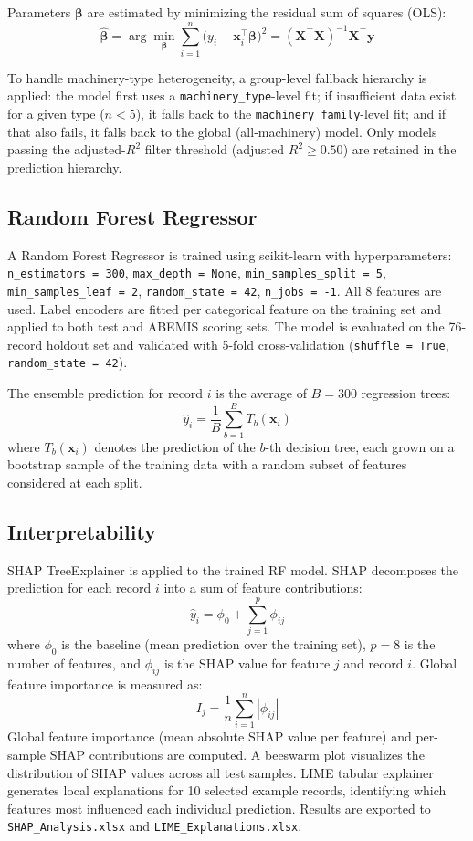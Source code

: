 \documentclass[conference]{IEEEtran}
\begin{document}
Parameters $\boldsymbol{\beta}$ are estimated by minimizing the residual sum of squares (OLS):
\[
\hat{\boldsymbol{\beta}} = \arg\min_{\boldsymbol{\beta}} \sum_{i=1}^{n}\bigl(y_i - \mathbf{x}_i^{\top}\boldsymbol{\beta}\bigr)^2 = (\mathbf{X}^{\top}\mathbf{X})^{-1}\mathbf{X}^{\top}\mathbf{y}
\]

To handle machinery-type heterogeneity, a group-level fallback hierarchy is applied: the model first uses a \texttt{machinery\_type}-level fit; if insufficient data exist for a given type ($n < 5$), it falls back to the \texttt{machinery\_family}-level fit; and if that also fails, it falls back to the global (all-machinery) model. Only models passing the adjusted-$R^2$ filter threshold (adjusted $R^2 \geq 0.50$) are retained in the prediction hierarchy.

\subsection{Random Forest Regressor}

A Random Forest Regressor is trained using scikit-learn with hyperparameters: \texttt{n\_estimators\,=\,300}, \texttt{max\_depth\,=\,None}, \texttt{min\_samples\_split\,=\,5}, \texttt{min\_samples\_leaf\,=\,2}, \texttt{random\_state\,=\,42}, \texttt{n\_jobs\,=\,-1}. All 8 features are used. Label encoders are fitted per categorical feature on the training set and applied to both test and ABEMIS scoring sets. The model is evaluated on the 76-record holdout set and validated with 5-fold cross-validation (\texttt{shuffle\,=\,True}, \texttt{random\_state\,=\,42}).

The ensemble prediction for record $i$ is the average of $B = 300$ regression trees:
\[
\hat{y}_i = \frac{1}{B}\sum_{b=1}^{B} T_b(\mathbf{x}_i)
\]
where $T_b(\mathbf{x}_i)$ denotes the prediction of the $b$-th decision tree, each grown on a bootstrap sample of the training data with a random subset of features considered at each split.

\subsection{Interpretability}

SHAP TreeExplainer is applied to the trained RF model. SHAP decomposes the prediction for each record $i$ into a sum of feature contributions:
\[
\hat{y}_i = \phi_0 + \sum_{j=1}^{p} \phi_{ij}
\]
where $\phi_0$ is the baseline (mean prediction over the training set), $p = 8$ is the number of features, and $\phi_{ij}$ is the SHAP value for feature $j$ and record $i$. Global feature importance is measured as:
\[
I_j = \frac{1}{n}\sum_{i=1}^{n}|\phi_{ij}|
\]
Global feature importance (mean absolute SHAP value per feature) and per-sample SHAP contributions are computed. A beeswarm plot visualizes the distribution of SHAP values across all test samples. LIME tabular explainer generates local explanations for 10 selected example records, identifying which features most influenced each individual prediction. Results are exported to \texttt{SHAP\_Analysis.xlsx} and \texttt{LIME\_Explanations.xlsx}.
\end{document}
